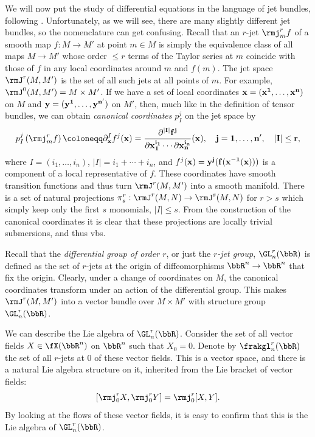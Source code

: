 We will now put the study of differential equations in the language of jet bundles, following \cite[\S3.2]{Kras}. Unfortunately, as we will see, there are many slightly different jet bundles, so the nomenclature can get confusing. Recall that an $r$-jet $\rmj^r_m f$ of a smooth map $f:M\to M'$ at point $m\in M$ is simply the equivalence class of all maps $M\to M'$ whose order $\leq r$ terms of the Taylor series  at $m$ coincide with those of $f$ in any local coordinates around $m$ and $f(m)$. The jet space $\rmJ^r(M,M')$ is the set of all such jets at all points of $m$. For example, $\rmJ^0(M,M')=M\times M'$. If we have a set of local coordinates $\bf{x}=(x^1,\ldots,x^n)$ on $M$ and $\bf{y}=(y^1,\ldots,y^{n'})$ on $M'$, then, much like in the definition of tensor bundles, we can obtain \emph{canonical coordinates} $p^j_I$ on the jet space by 
\[p^j_I\left(\rmj^r_mf\right)\coloneqq \partial^I_{\bf{x}}f^j(\bf{x})=\frac{\partial^{|I|}f^j}{\partial x_1^{i_1}\cdots\partial x_n^{i_n}}(\bf{x}),\quad j=1,\ldots,n',\quad |I|\leq r,\] 
where $I=(i_1,\ldots,i_n)$, $|I|=i_1+\cdots+i_n$, and $f^j(\bf{x})=y^j(f(\bf{x}^{-1}(\bf{x})))$ is a component of a local representative of $f$. These coordinates have smooth transition functions and thus turn $\rmJ^r(M,M')$ into a smooth manifold. There is a set of natural projections $\pi^r_{s}:\rmJ^r(M,N)\to \rmJ^s(M,N)$ for $r>s$ which simply keep only the first $s$ monomials, $|I|\leq s$. From the construction of the canonical coordinates it is clear that these projections are locally trivial submersions, and thus \glspl{vb}.

Recall that the \emph{differential group of order $r$}, or just the \emph{$r$-jet group},  $\GL_n^r(\bbR)$ is defined as the set of $r$-jets at the origin of diffeomorphisms $\bbR^n\to \bbR^n$ that fix the origin. Clearly, under a change of coordinates on $M$, the canonical coordinates transform under an action of the differential group. This makes $\rmJ^r(M,M')$ into a vector bundle over $M\times M'$ with structure group $\GL_n^r(\bbR)$. 

We can describe the Lie algebra of $\GL^r_n(\bbR)$. Consider the set of all vector fields $X\in\fX(\bbR^n)$ on $\bbR^n$ such that $X_0=0$. Denote by $\frakgl^r_n(\bbR)$ the set of all $r$-jets at $0$ of these vector fields. This is a vector space, and there is a natural Lie algebra structure on it, inherited from the Lie bracket of vector fields:
\[[\rmj_0^r X,\rmj_0^r Y]=\rmj^r_0[X,Y].\]
By looking at the flows of these vector fields, it is easy to confirm that this is the Lie algebra of $\GL^r_n(\bbR)$.

